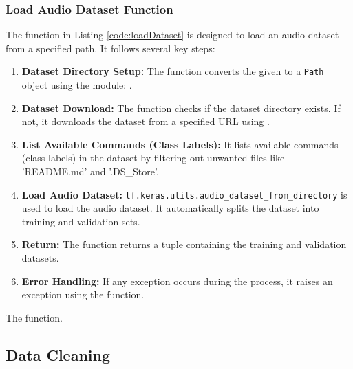 \subsubsection{Load Audio Dataset Function}

The  function in Listing \ref{code:loadDataset} is designed to load an audio dataset from a specified path. It follows several key steps:

\begin{enumerate}
	\item \textbf{Dataset Directory Setup:} The function converts the given  to a \texttt{Path} object using the  module: .
	
	\item \textbf{Dataset Download:} The function checks if the dataset directory exists. If not, it downloads the dataset from a specified URL using .
	
	\item \textbf{List Available Commands (Class Labels):} It lists available commands (class labels) in the dataset by filtering out unwanted files like 'README.md' and '.DS\_Store'.
	
	\item \textbf{Load Audio Dataset:} \texttt{tf.keras.utils.audio\_dataset\_from\_directory} is used to load the audio dataset. It automatically splits the dataset into training and validation sets.
	
	\item \textbf{Return:} The function returns a tuple containing the training and validation datasets.
	
	\item \textbf{Error Handling:} If any exception occurs during the process, it raises an exception using the  function.
\end{enumerate}

\begin{code}
	    
	
	\caption{The  function.}
	\label{code:loadDataset}
\end{code}


\subsection{Data Cleaning}

